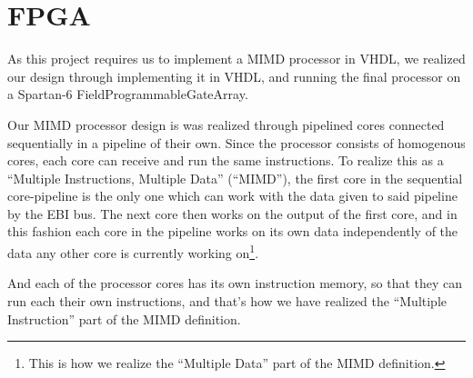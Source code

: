 \FloatBarrier
\chapter{FPGA}\label{chapter:fpga}

As this project requires us to implement a MIMD processor in VHDL, we realized
our design through implementing it in VHDL, and running the final processor on a
Spartan-6\cite{fpga-chip} FieldProgrammableGateArray.

Our MIMD processor design is was realized through pipelined cores connected
sequentially in a pipeline of their own. Since the processor consists of
homogenous cores, each core can receive and run the same instructions. To
realize this as a ``Multiple Instructions, Multiple Data'' (``MIMD''), the first
core in the sequential core-pipeline is the only one which can work with the
data given to said pipeline by the EBI bus. The next core then works on the
output of the first core, and in this fashion each core in the pipeline works on
its own data independently of the data any other core is currently working
on\footnote{This is how we realize the ``Multiple Data'' part of the MIMD
definition.}.

And each of the processor cores has its own instruction memory, so that they can
run each their own instructions, and that's how we have realized the ``Multiple
Instruction'' part of the MIMD definition.
\newpage







